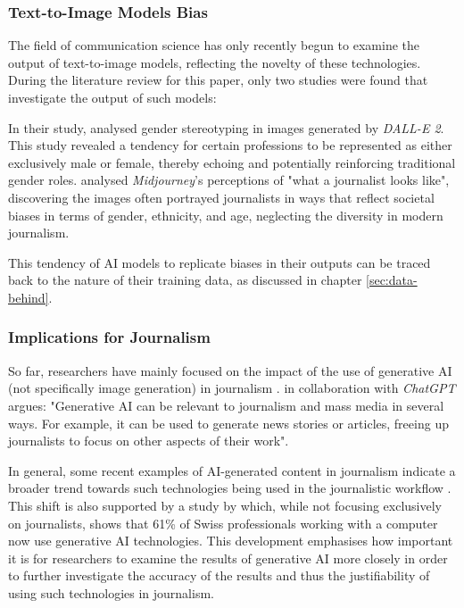 \label{sec:data-behind}


\subsubsection{Text-to-Image Models Bias }
The field of communication science has only recently begun to examine the output of text-to-image models, reflecting the novelty of these technologies. During the literature review for this paper, only two studies were found that investigate the output of such models:

In their study, \textcite{Garcia2023} analysed gender stereotyping in images generated by \textit{DALL-E 2}. This study revealed a tendency for certain professions to be represented as either exclusively male or female, thereby echoing and potentially reinforcing traditional gender roles. \textcite{Thomas2023} analysed \textit{Midjourney}'s perceptions of "what a journalist looks like", discovering the images often portrayed journalists in ways that reflect societal biases in terms of gender, ethnicity, and age, neglecting the diversity in modern journalism.

This tendency of AI models to replicate biases in their outputs can be traced back to the nature of their training data, as discussed in chapter \ref{sec:data-behind}. 
\subsubsection{Implications for Journalism}

So far, researchers have mainly focused on the impact of the use of generative AI (not specifically image generation) in journalism \parencite{Broussard2019}. \textcite[87]{Pavlik2023} in collaboration with \textit{ChatGPT} argues: "Generative AI can be relevant to journalism and mass media in several ways. For example, it can be used to generate news stories or articles, freeing up journalists to focus on other aspects of their work".

In general, some recent examples of AI-generated content in journalism indicate a broader trend towards such technologies being used in the journalistic workflow \parencite{Henrich2023, Kim2023}. This shift is also supported by a study by \textcite{Deloitte2023} which, while not focusing exclusively on journalists, shows that 61\% of Swiss professionals working with a computer now use generative AI technologies. This development emphasises how important it is for researchers to examine the results of generative AI more closely in order to further investigate the accuracy of the results and thus the justifiability of using such technologies in journalism.

